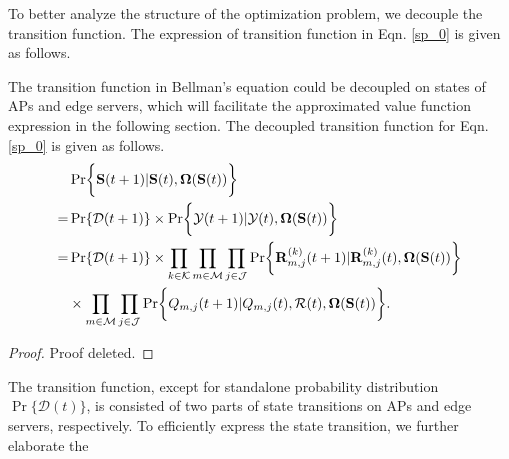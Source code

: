 To better analyze the structure of the optimization problem, we decouple the transition function.
The expression of transition function in Eqn. \ref{sp_0} is given as follows.
\begin{lemma}
    The transition function in Bellman's equation could be decoupled on states of APs and edge servers, which will facilitate the approximated value function expression in the following section.
    The decoupled transition function for Eqn. \ref{sp_0} is given as follows.
    \begin{align}
        & \Pr\Brace{ \Stat({t+1})|\Stat({t}), \Policy(\Stat({t})) }
        \nonumber\\
        =& \Pr\{\mathcal{D}({t+1})\} \times \Pr\Brace{ \Obsv({t+1})|\Obsv({t}), \Policy(\Stat({t}))}
        \nonumber\\
        =& \Pr\{\mathcal{D}({t+1})\} \times \prod_{k\in\apSet}\prod_{m\in\esSet}\prod_{j\in\jSpace}
                \Pr\Brace{
                    \vec{R}^{(k)}_{m,j}({t+1}) | \vec{R}^{(k)}_{m,j}({t}),
                    \Policy(\Stat({t}))
                }  
            \nonumber\\
            & \times \prod_{m\in\esSet}\prod_{j\in\jSpace}
                \Pr\Brace{
                    Q_{m,j}({t+1})|Q_{m,j}({t}), \mathcal{R}({t}), \Policy(\Stat({t}))
                }.
    \end{align}
\end{lemma}
\begin{proof}
    Proof deleted.
\end{proof}

The transition function, except for standalone probability distribution $\Pr\{\mathcal{D}({t})\}$, is consisted of two parts of state transitions on APs and edge servers, respectively.
To efficiently express the state transition, we further elaborate the 

